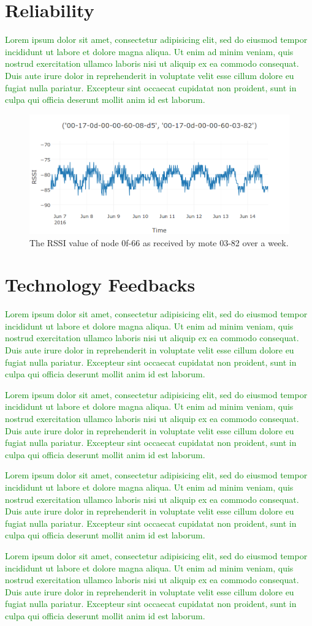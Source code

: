 \documentclass{sig-alternate}
\newcommand{\lorem}               {\textcolor{green}{Lorem ipsum dolor sit amet, consectetur adipisicing elit, sed do eiusmod tempor incididunt ut labore et dolore magna aliqua. Ut enim ad minim veniam, quis nostrud exercitation ullamco laboris nisi ut aliquip ex ea commodo consequat. Duis aute irure dolor in reprehenderit in voluptate velit esse cillum dolore eu fugiat nulla pariatur. Excepteur sint occaecat cupidatat non proident, sunt in culpa qui officia deserunt mollit anim id est laborum.}}
\begin{document}
\section{Reliability}
\label{sec:reliability}


\lorem

\begin{figure}
    \centering
    \includegraphics[width=\columnwidth]{periodic_rssi}
    \caption{The RSSI value of node 0f-66 as received by mote 03-82 over a week.}
    \label{fig:reliability}
\end{figure}

\section{Technology Feedbacks}
\label{sec:technology}


\lorem


\lorem


\lorem


\lorem






\end{document}
